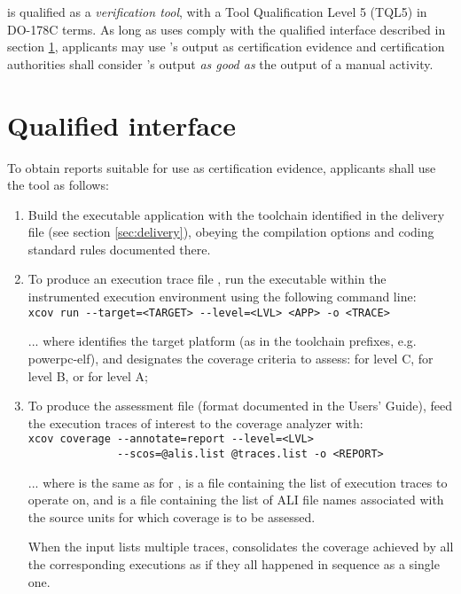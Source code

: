 \documentclass {report}
\begin{document}
\xcov{} is qualified as a \emph{verification tool}, with a Tool Qualification
Level 5 (TQL5) in DO-178C terms.
%
As long as uses comply with the qualified interface described in
section \ref{sec:qual-interface}, applicants may use \xcov{}'s output as
certification evidence and certification authorities shall consider \xcov{}'s
output \emph{as good as} the output of a manual activity.

\section{Qualified interface}
\label{sec:qual-interface}

To obtain reports suitable for use as certification evidence, applicants
shall use the \xcov{} tool as follows:

\begin{enumerate}
\item Build the executable application with the \gnatp{} toolchain identified
  in the delivery file (see section \ref{sec:delivery}), obeying the
  compilation options and coding standard rules documented there.

\item To produce an execution trace file , run the 
  executable within the instrumented execution environment using the
  following command line:\\

{\small
\verb|xcov run --target=<TARGET> --level=<LVL> <APP> -o <TRACE>| \\
}

... where  identifies the target platform (as in the \gnatp{}
toolchain prefixes, e.g.  powerpc-elf), and  designates the coverage
criteria to assess:  for level C,  for level B, or
 for level A;

\item To produce the assessment  file (format documented in
  the \xcov{} Users' Guide), feed the execution traces
  of interest to the coverage analyzer with:\\

{\small
\verb|xcov coverage --annotate=report --level=<LVL>| \\
\verb|              --scos=@alis.list @traces.list -o <REPORT>| \\
}

... where  is the same as for ,  is a file
containing the list of execution traces to operate on, and  is a
file containing the list of \gnatp{} ALI file names associated with the source
units for which coverage is to be assessed.

When the  input lists multiple traces, \xcov{} consolidates the
coverage achieved by all the corresponding executions as if they all happened
in sequence as a single one.

\end{enumerate}
\end{document}
